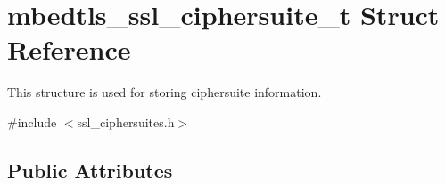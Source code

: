 \hypertarget{structmbedtls__ssl__ciphersuite__t}{\section{mbedtls\-\_\-ssl\-\_\-ciphersuite\-\_\-t Struct Reference}
\label{structmbedtls__ssl__ciphersuite__t}
}


This structure is used for storing ciphersuite information.  




{\ttfamily \#include $<$ssl\-\_\-ciphersuites.\-h$>$}

\subsection*{Public Attributes}
